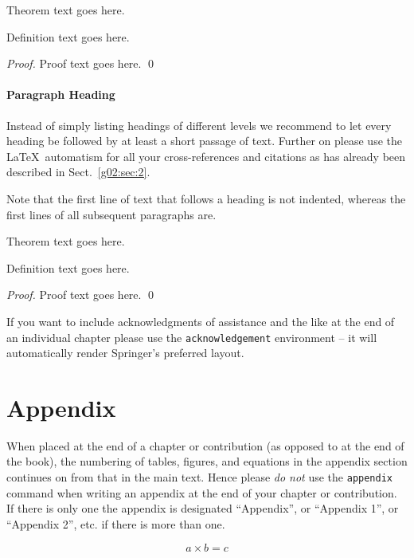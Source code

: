\begin{theorem}
Theorem text goes here.
\end{theorem}
%
%
\begin{definition}
Definition text goes here.
\end{definition}

\begin{proof}
Proof text goes here.
\qed
\end{proof}

\paragraph{Paragraph Heading} %
Instead of simply listing headings of different levels we recommend to let every heading be followed by at least a short passage of text. Further on please use the \LaTeX\ automatism for all your cross-references and citations as has already been described in Sect.~\ref{g02:sec:2}.

Note that the first line of text that follows a heading is not indented, whereas the first lines of all subsequent paragraphs are.
%
%
\begin{theorem}
Theorem text goes here.
\end{theorem}
%
\begin{definition}
Definition text goes here.
\end{definition}
%
\begin{proof}
\smartqed
Proof text goes here.
\qed
\end{proof}
%
\begin{acknowledgement}
If you want to include acknowledgments of assistance and the like at the end of an individual chapter please use the \verb|acknowledgement| environment -- it will automatically render Springer's preferred layout.
\end{acknowledgement}
%
\section*{Appendix}
%
%
When placed at the end of a chapter or contribution (as opposed to at the end of the book), the numbering of tables, figures, and equations in the appendix section continues on from that in the main text. Hence please \textit{do not} use the \verb|appendix| command when writing an appendix at the end of your chapter or contribution. If there is only one the appendix is designated ``Appendix'', or ``Appendix 1'', or ``Appendix 2'', etc. if there is more than one.

\begin{equation}
a \times b = c
\end{equation}

